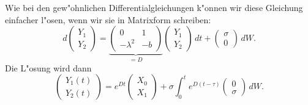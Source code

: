 Wie bei den gew"ohnlichen Differentialgleichungen k"onnen wir diese
Gleichung einfacher l"osen, wenn wir sie in Matrixform schreiben:
\begin{equation}
d\begin{pmatrix}Y_1\\Y_2\end{pmatrix}
=
\underbrace{
\begin{pmatrix}
         0& 1\\
-\lambda^2&-b
\end{pmatrix}}_{\textstyle=D}
\begin{pmatrix}Y_1\\Y_2\end{pmatrix}\,dt
+
\begin{pmatrix}
\sigma\\0
\end{pmatrix}\,dW.
\end{equation}
Die L"osung wird dann
\begin{equation}
\begin{pmatrix}
Y_1(t)\\Y_2(t)
\end{pmatrix}
=
e^{Dt}\begin{pmatrix}X_0\\X_1\end{pmatrix}
+
\sigma \int_0^t e^{D(t-\tau)}\begin{pmatrix}0\\\sigma\end{pmatrix}\,dW.
\label{stochastisch:harmosz-explsg}
\end{equation}

